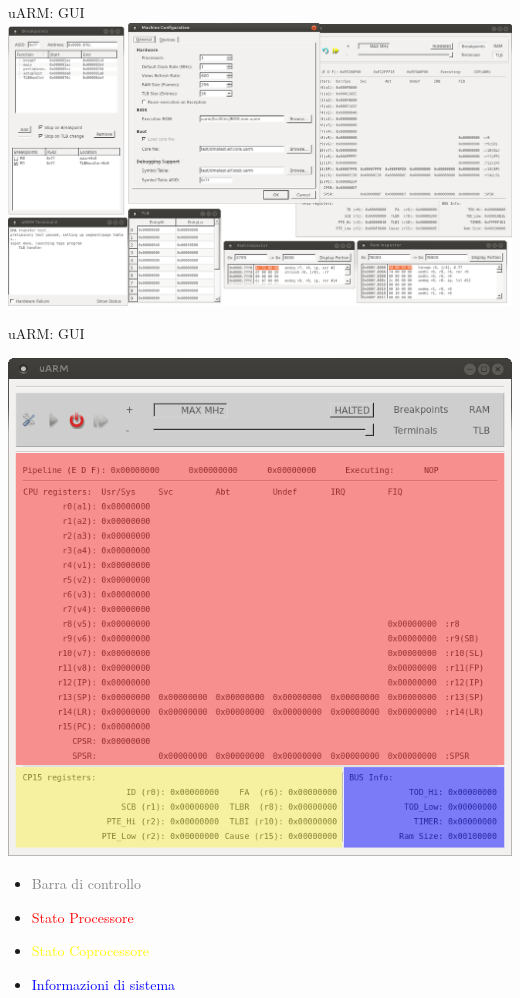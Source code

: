 \documentclass{beamer}
\begin{document}
\begin{frame}{uARM: GUI}
\centering
\includegraphics[width=\textwidth]{img/gui_completa.png}
\end{frame}

\begin{frame}{uARM: GUI}
\begin{center}
\includegraphics[height=0.6\textheight]{img/gui_colori.png}
\end{center}

{\footnotesize
\begin{itemize}\itemsep1pt
\item \textcolor{gray}{Barra di controllo}
\item \textcolor{red}{Stato Processore}
\item \textcolor{yellow}{Stato Coprocessore}
\item \textcolor{blue}{Informazioni di sistema}
\end{itemize}}
\end{frame}
\end{document}
